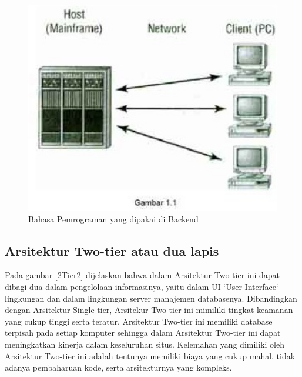 {\begin{figure}[ht]
    \centerline{\includegraphics[width=1\textwidth]{figures/2modelstandalone.jpg}}
    \caption{Bahasa Pemrograman yang dipakai di Backend}
    \label{1Stand}
\end{figure}

\subsection{Arsitektur Two-tier atau dua lapis}
Pada gambar \ref{2Tier2} dijelaskan bahwa dalam Arsitektur Two-tier ini dapat dibagi dua dalam pengelolaan informasinya, yaitu dalam UI `User Interface` lingkungan dan dalam
lingkungan server manajemen databasenya. Dibandingkan dengan Arsitektur Single-tier, Arsitekur Two-tier ini mimiliki tingkat
keamanan yang cukup tinggi serta teratur. Arsitektur Two-tier ini memiliki database terpisah pada setiap komputer sehingga dalam
Arsitektur Two-tier ini dapat meningkatkan kinerja dalam keseluruhan situs. Kelemahan yang dimiliki oleh Arsitektur Two-tier ini
adalah tentunya memiliki biaya yang cukup mahal, tidak adanya pembaharuan kode, serta arsitekturnya yang kompleks.

}
